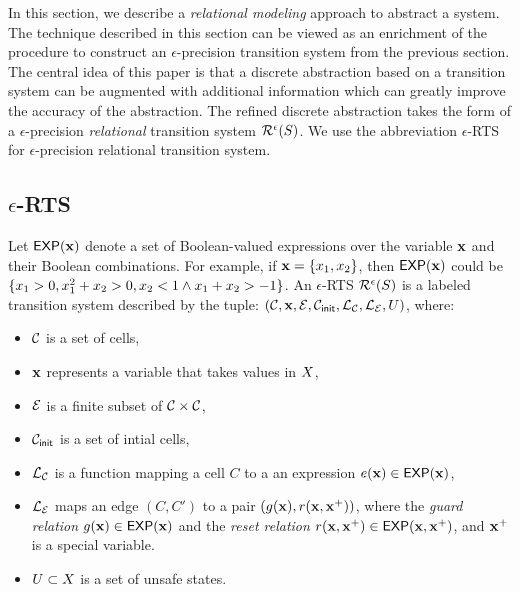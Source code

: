 In this section, we describe a {\em relational modeling} approach to
abstract a system. The technique described in this section can be
viewed as an enrichment of the procedure to construct an
$\epsilon$-precision transition system from the previous section.  The
central idea of this paper is that a discrete abstraction based on a
transition system can be augmented with additional information which
can greatly improve the accuracy of the abstraction. The refined
discrete abstraction takes the form of a $\epsilon$-precision {\em
relational} transition system $\mathcal{R}^{\epsilon}(S)$. We
use the abbreviation $\epsilon$-RTS for $\epsilon$-precision
relational transition system.

\subsection{$\epsilon$-RTS}
Let $\mathsf{EXP}(\mathbf{x})$ denote a set of Boolean-valued expressions over the
variable $\mathbf{x}$ and their Boolean combinations.  For example, if $\mathbf{x} =
\{x_1,x_2\}$, then $\mathsf{EXP}(\mathbf{x})$ could be $\{ x_1 > 0, x^2_1
+ x_2 > 0, x_2 < 1 \wedge x_1 + x_2 > -1\}$.  An $\epsilon$-RTS
$\mathcal{R}^{\epsilon}(S)$ is a labeled transition system
described by the tuple:
$(\mathcal{C},\mathbf{x},\mathcal{E},\mathcal{C}_{\mathsf{init}},\mathcal{L}_\mathcal{C},
\mathcal{L}_\mathcal{E},U)$, where:

\begin{itemize}[label=--,leftmargin=1em,labelsep=*]
\item
$\mathcal{C}$ is a set of cells,
\item
$\mathbf{x}$ represents a variable that takes values in $X$, 
\item
$\mathcal{E}$ is a finite subset of $\mathcal{C} \times \mathcal{C}$, 
\item
$\mathcal{C}_{\mathsf{init}}$ is a set of intial cells, 
\item
$\mathcal{L}_\mathcal{C}$ is a function mapping a cell $C$ to a
an expression $e(\mathbf{x}) \in \mathsf{EXP}(\mathbf{x})$,
\item
$\mathcal{L}_\mathcal{E}$ maps an edge $(C,C')$ to a pair $(g(\mathbf{x}),
r(\mathbf{x},\mathbf{x}^{+}))$, where the {\em guard relation} $g(\mathbf{x}) \in \mathsf{EXP}(\mathbf{x})$
and the {\em reset relation} $r(\mathbf{x},\mathbf{x}^{+}) \in \mathsf{EXP}(\mathbf{x},\mathbf{x}^{+})$, and
$\mathbf{x}^{+}$ is a special variable.
\item
$U \subset X$ is a set of unsafe states.
\end{itemize}



